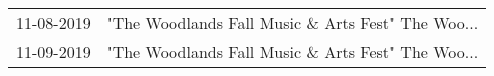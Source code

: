\begin{supertabular}{ll}
 11-08-2019 &  "The Woodlands Fall Music \& Arts Fest" The Woo... \\
 11-09-2019 &  "The Woodlands Fall Music \& Arts Fest" The Woo... \\
\end{supertabular}
